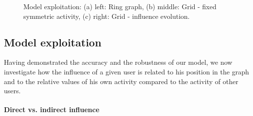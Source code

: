 \documentclass[10pt, conference, letterpaper]{IEEEtran}
\begin{document}
{%
\begin{figure}[t!]
\centering
\caption{Model exploitation: (a) left: Ring graph, (b) middle: Grid - fixed symmetric activity, (c) right: Grid - influence evolution.}
\label{perf fig}
\end{figure}	

\subsection{Model exploitation} \label{exploit}


Having demonstrated the accuracy and the robustness of our model, we now investigate how the influence of a given user is related to his position in the graph and to the relative values of his own activity compared to the activity of other users.
	
\paragraph{Direct vs. indirect influence}

}
\end{document}
